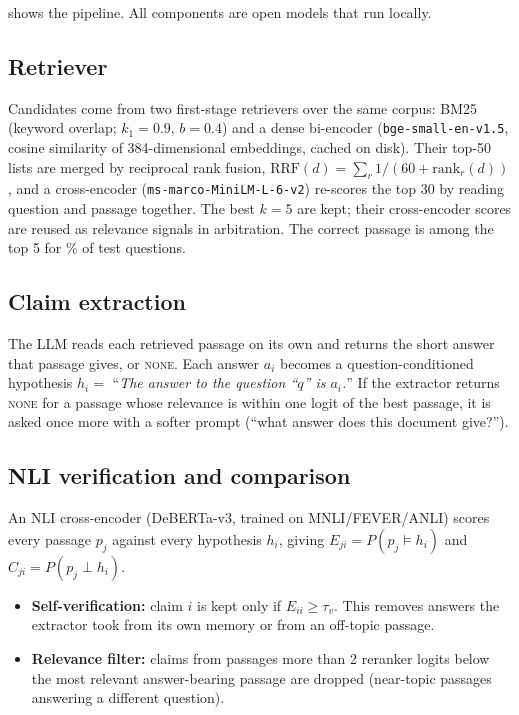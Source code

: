 \documentclass[11pt]{article}
\begin{document}
 shows the pipeline. All components are open models that run locally.

\subsection{Retriever}
Candidates come from two first-stage retrievers over the same corpus: BM25 (keyword overlap;
$k_1{=}0.9$, $b{=}0.4$) and a dense bi-encoder (\texttt{bge-small-en-v1.5}, cosine similarity of
384-dimensional embeddings, cached on disk). Their top-50 lists are merged by reciprocal rank
fusion, $\mathrm{RRF}(d)=\sum_{r}1/(60+\mathrm{rank}_r(d))$, and a cross-encoder
(\texttt{ms-marco-MiniLM-L-6-v2}) re-scores the top 30 by reading question and passage together.
The best $k{=}5$ are kept; their cross-encoder scores are reused as relevance signals in
arbitration. The correct passage is among the top 5 for \% of test
questions.

\subsection{Claim extraction}
The LLM reads each retrieved passage on its own and returns the short answer that passage gives,
or \textsc{none}. Each answer $a_i$ becomes a question-conditioned hypothesis
$h_i=$ ``\emph{The answer to the question ``$q$'' is $a_i$.}'' If the extractor returns \textsc{none}
for a passage whose relevance is within one logit of the best passage, it is asked once more with a
softer prompt (``what answer does this document give?'').

\subsection{NLI verification and comparison}
An NLI cross-encoder (DeBERTa-v3, trained on MNLI/FEVER/ANLI) scores every passage $p_j$ against
every hypothesis $h_i$, giving $E_{ji}=P(p_j\models h_i)$ and $C_{ji}=P(p_j\perp h_i)$.
\begin{itemize}
  \item \textbf{Self-verification:} claim $i$ is kept only if $E_{ii}\ge\tau_v$. This removes answers
        the extractor took from its own memory or from an off-topic passage.
  \item \textbf{Relevance filter:} claims from passages more than 2 reranker logits below the most
        relevant answer-bearing passage are dropped (near-topic passages answering a different
        question).
\end{itemize}
\end{document}
